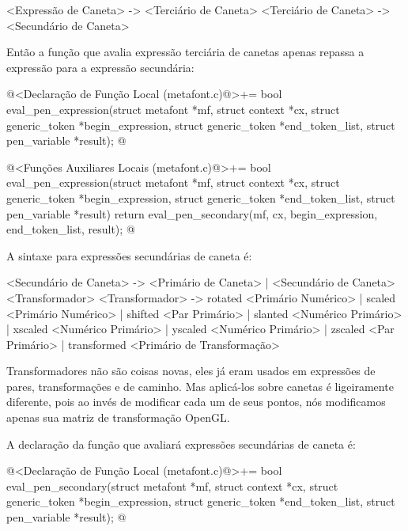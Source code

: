 {\alinhaverbatim
<Expressão de Caneta> -> <Terciário de Caneta>
<Terciário de Caneta> -> <Secundário de Caneta>
\alinhanormal

Então a função que avalia expressão terciária de canetas apenas
repassa a expressão para a expressão secundária:

\iniciocodigo
@<Declaração de Função Local (metafont.c)@>+=
bool eval_pen_expression(struct metafont *mf, struct context *cx,
                        struct generic_token *begin_expression,
                        struct generic_token *end_token_list,
                        struct pen_variable *result);
@
\fimcodigo

\iniciocodigo
@<Funções Auxiliares Locais (metafont.c)@>+=
bool eval_pen_expression(struct metafont *mf, struct context *cx,
                        struct generic_token *begin_expression,
                        struct generic_token *end_token_list,
                        struct pen_variable *result){
  return eval_pen_secondary(mf, cx, begin_expression, end_token_list, result);
}
@
\fimcodigo


A sintaxe para expressões secundárias de caneta é:

\alinhaverbatim
<Secundário de Caneta> -> <Primário de Caneta> |
                          <Secundário de Caneta> <Transformador>
<Transformador> -> rotated <Primário Numérico> |
                   scaled <Primário Numérico> |
                   shifted <Par Primário> |
                   slanted <Numérico Primário> |
                   xscaled <Numérico Primário> |
                   yscaled <Numérico Primário> |
                   zscaled <Par Primário> |
                   transformed <Primário de Transformação>
\alinhanormal

Transformadores não são coisas novas, eles já eram usados em
expressões de pares, transformações e de caminho. Mas aplicá-los sobre
canetas é ligeiramente diferente, pois ao invés de modificar cada um
de seus pontos, nós modificamos apenas sua matriz de transformação
OpenGL.

A declaração da função que avaliará expressões secundárias de caneta
é:

\iniciocodigo
@<Declaração de Função Local (metafont.c)@>+=
bool eval_pen_secondary(struct metafont *mf, struct context *cx,
                        struct generic_token *begin_expression,
                        struct generic_token *end_token_list,
                        struct pen_variable *result);
@
\fimcodigo

}
